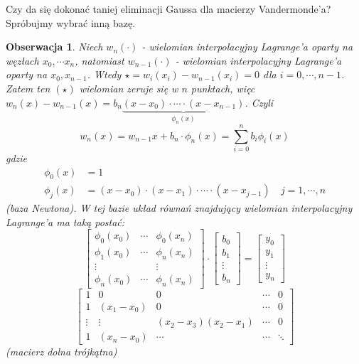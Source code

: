 \documentclass[hidelinks,a4paper,fleqn,oneside]{book}
\newtheorem{obserw}{Obserwacja}
\begin{document}
Czy da się dokonać taniej eliminacji Gaussa dla macierzy Vandermonde'a? Spróbujmy wybrać inną bazę.

\begin{obserw}
Niech $w_n(\cdot)$ - wielomian interpolacyjny Lagrange'a oparty na węzłach $x_0, \cdots x_n$, natomiast $w_{n-1}(\cdot)$ - wielomian interpolacyjny Lagrange'a oparty na $x_0, x_{n-1}$. Wtedy $\star = w_i(x_i) - w_{n-1}(x_i) = 0$ dla $i=0, \cdots, n-1$. Zatem ten $(\star)$ wielomian zeruje się w $n$ punktach, więc $w_n(x) - w_{n-1}(x) = b_n\underbrace{(x-x_0)\cdot \cdots \cdot (x-x_{n-1})}_{\phi_n(x)}$. Czyli
\[
	w_n(x) = w_{n-1}x + b_n\cdot\phi_n(x) = \sum_{i=0}^{n} b_i\phi_i(x)
\]
gdzie 
\begin{align*}
    \phi_0(x) & = 1\\
    \phi_j(x) & = (x-x_0) \cdot (x-x_1) \cdot \cdots \cdot (x - x_{j-1}) \quad j=1, \cdots, n
\end{align*}
(baza Newtona). W tej bazie układ równań znajdujący wielomian interpolacyjny Lagrange'a ma taką postać:
\[
\left[
	\begin{array}{ccc}
		\phi_0(x_0) & \cdots & \phi_0(x_n) \\
		\phi_1(x_0) & \cdots & \phi_n(x_n) \\
		\vdots & & \vdots \\
		\phi_n(x_0) & \cdots & \phi_n(x_n)
	\end{array}
\right]
\cdot
\left[
	\begin{array}{c}
		b_0 \\
		b_1 \\
		\vdots \\
		b_n
	\end{array}
\right]
=
\left[
	\begin{array}{c}
		y_0 \\
		y_1 \\
		\vdots \\
		y_n
	\end{array}
\right]
\]
\[
\left[
\begin{array}{ccccc}
1 & 0 & 0 & \cdots & 0 \\
1 & (x_1 - x_0) & 0 & \cdots & 0 \\
\vdots & \vdots & (x_2 - x_3)(x_2 - x_1) & \cdots & 0 \\
1 & (x_n - x_0) & \cdots & \cdots & \ddots
\end{array}
\right]
\]
(macierz dolna trójkątna)
\end{obserw}
\end{document}
